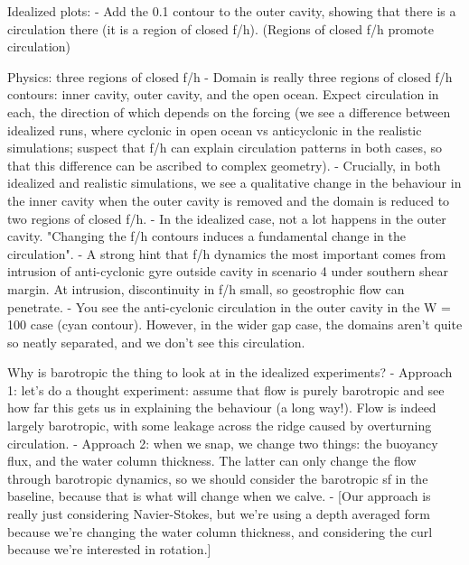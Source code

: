 Idealized plots:
    - Add the 0.1 contour to the outer cavity, showing that there is a circulation there (it is a region of closed f/h). (Regions of closed f/h promote circulation)

Physics: three regions of closed f/h
    - Domain is really three regions of closed f/h contours: inner cavity, outer cavity, and the open ocean. Expect circulation in each, the direction of which depends on the forcing (we see a difference between idealized runs, where cyclonic in open ocean vs anticyclonic in the realistic simulations; suspect that f/h can explain circulation patterns in both cases, so that this difference can be ascribed to complex geometry).
    - Crucially, in both idealized and realistic simulations, we see a qualitative change in the behaviour in the inner cavity when the outer cavity is removed and the domain is reduced to two regions of closed f/h. 
    - In the idealized case, not a lot happens in the outer cavity. "Changing the f/h contours induces a fundamental change in the circulation".
    - A strong hint that f/h dynamics the most important comes from intrusion of anti-cyclonic gyre outside cavity in scenario 4 under southern shear margin. At intrusion, discontinuity in f/h small, so geostrophic flow can penetrate.
    - You see the anti-cyclonic circulation in the outer cavity in the W = 100 case (cyan contour). However, in the wider gap case, the domains aren't quite so neatly separated, and we don't see this circulation.
    
Why is barotropic the thing to look at in the idealized experiments?
    - Approach 1: let's do a thought experiment: assume that flow is purely barotropic and see how far this gets us in explaining the behaviour (a long way!). Flow is indeed largely barotropic, with some leakage across the ridge caused by overturning circulation.
    - Approach 2: when we snap, we change two things: the buoyancy flux, and the water column thickness. The latter can only change the flow through barotropic dynamics, so we should consider the barotropic sf in the baseline, because that is what will change when we calve. 
    - [Our approach is really just considering Navier-Stokes, but we're using a depth averaged form because we're changing the water column thickness, and considering the curl because we're interested in rotation.]

    
